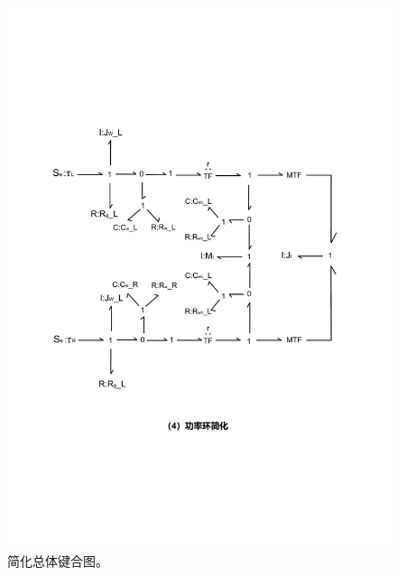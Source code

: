 \begin{figure}[!h]
	\centering
	\includegraphics[width=1.2\textwidth,angle=90]{fig/3_4_bond.pdf}
	\caption{简化总体键合图。}\label{fig:part2_bond}
\end{figure}

